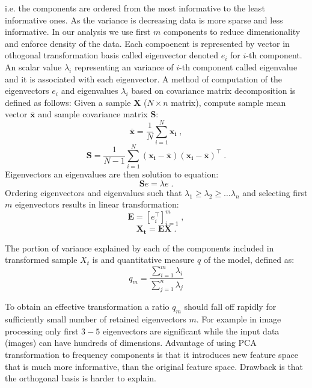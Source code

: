 i.e. the components are ordered from the most informative to the least informative ones.
As the variance is decreasing data is more sparse and less informative.
In our analysis we use first $m$ components to reduce dimensionality and enforce
density of the data. Each compoenent is represented by vector in othogonal transformation basis
called eigenvector denoted $e_i$ for $i$-th component.
An scalar value $\lambda_i$ representing an variance of $i$-th component called eigenvalue and it 
is associated with each eigenvector.
A method of computation of the eigenvectors $e_i$ and eigenvalues $\lambda_i$ based on covariance matrix
decomposition is defined as follows: Given a sample $\mathbf{X}$ ($N\times n$ matrix), 
compute sample mean vector $\overline{\mathbf{x}}$ and sample covariance matrix $\mathbf{S}$:
\begin{equation}\label{eq:sampmean}
	\overline{\mathbf{x}} = \frac{1}{N} \sum_{i=1}^N \mathbf{x_i} \;,
\end{equation}
\begin{equation}\label{eq:sampcov}
	\mathbf{S} = \frac{1}{N-1} \sum_{i=1}^N  \left(\mathbf{x_i} - \overline{\mathbf{x}} \right) 
	\left(\mathbf{x_i} - \overline{\mathbf{x}} \right)^\top \;.
\end{equation}
Eigenvectors an eigenvalues are then solution to equation:
\begin{equation}
	\mathbf{S}e = \lambda e \;.
\end{equation}
Ordering eigenvectors and eigenvalues such that $\lambda_1 \geq \lambda_2 \geq \dots \lambda_n$ and
selecting first $m$ eigenvectors results in linear transformation:
\begin{equation}
	\mathbf{E} = \left[ e_i^\top \right]_{i=1}^m\;,
\end{equation}
\begin{equation}
	\mathbf{X_t} = \mathbf{E} \mathbf{X} \;.	
\end{equation}

The  portion of variance explained by each of the components included in transformed sample $X_t$
is and quantitative measure $q$ of the model, defined as:
\begin{equation}
	q_m = \frac{\sum_{i=1}^m\lambda_i}{\sum_{j=1}^n\lambda_j} 
\end{equation}

To obtain an effective transformation a ratio $q_m$ should fall off rapidly  for sufficiently small number
of retained eigenvectors $m$. For example in image processing only first $3-5$ eigenvectors are 
significant while the input data (images) can have hundreds of dimensions.
Advantage of using PCA transformation to frequency components is that it introduces new feature space
that is much more informative, than the original feature space. Drawback is that the orthogonal basis 
is harder to explain.

